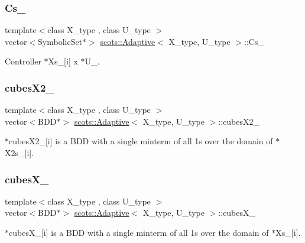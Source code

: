 \subsubsection{\texorpdfstring{Cs\+\_\+}{Cs\_}}
{\footnotesize\ttfamily template$<$class X\+\_\+type , class U\+\_\+type $>$ \\
vector$<$Symbolic\+Set$\ast$$>$ \hyperlink{classscots_1_1Adaptive}{scots\+::\+Adaptive}$<$ X\+\_\+type, U\+\_\+type $>$\+::Cs\+\_\+}

Controller  $\ast$\+Xs\+\_\+\mbox{[}i\mbox{]} x $\ast$\+U\+\_\+. \mbox{\label{classscots_1_1Adaptive_a6fa7b7542b91ec37ff2358359e425d12}} 
\subsubsection{\texorpdfstring{cubes\+X2\+\_\+}{cubesX2\_}}
{\footnotesize\ttfamily template$<$class X\+\_\+type , class U\+\_\+type $>$ \\
vector$<$B\+DD$\ast$$>$ \hyperlink{classscots_1_1Adaptive}{scots\+::\+Adaptive}$<$ X\+\_\+type, U\+\_\+type $>$\+::cubes\+X2\+\_\+}

$\ast$cubes\+X2\+\_\+\mbox{[}i\mbox{]} is a B\+DD with a single minterm of all 1s over the domain of $\ast$\+X2s\+\_\+\mbox{[}i\mbox{]}. \mbox{\label{classscots_1_1Adaptive_ac82296bd0392bccf2a0e4af9ba70ff37}} 
\subsubsection{\texorpdfstring{cubes\+X\+\_\+}{cubesX\_}}
{\footnotesize\ttfamily template$<$class X\+\_\+type , class U\+\_\+type $>$ \\
vector$<$B\+DD$\ast$$>$ \hyperlink{classscots_1_1Adaptive}{scots\+::\+Adaptive}$<$ X\+\_\+type, U\+\_\+type $>$\+::cubes\+X\+\_\+}

$\ast$cubes\+X\+\_\+\mbox{[}i\mbox{]} is a B\+DD with a single minterm of all 1s over the domain of $\ast$\+Xs\+\_\+\mbox{[}i\mbox{]}. \mbox{\label{classscots_1_1Adaptive_a0332230a9bad14d432e6651611863be9}} 
